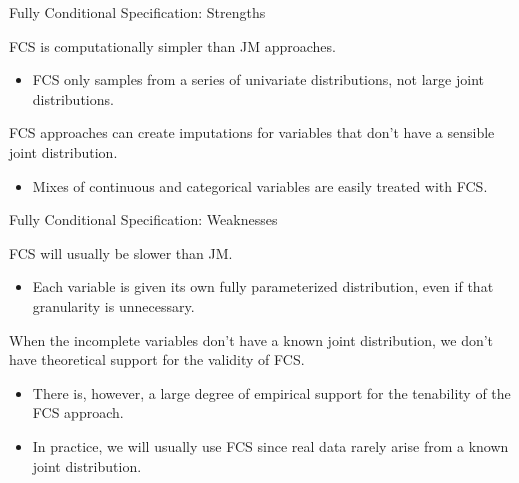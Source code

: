 \documentclass{beamer}\usepackage[]{graphicx}\usepackage[]{color}
\begin{document}

\begin{frame}{Fully Conditional Specification: Strengths}
  
  FCS is computationally simpler than JM approaches.
  \vc
  \begin{itemize}
  \item FCS only samples from a series of univariate distributions, not large 
    joint distributions.
  \end{itemize}
  \va 
  FCS approaches can create imputations for variables that don't have a sensible 
  joint distribution.
  \vc
  \begin{itemize}
  \item Mixes of continuous and categorical variables are easily treated with 
    FCS.
  \end{itemize}
  
\end{frame}


\begin{frame}{Fully Conditional Specification: Weaknesses}

  FCS will usually be slower than JM.
  \vc
  \begin{itemize}
  \item Each variable is given its own fully parameterized distribution, even if 
    that granularity is unnecessary.
  \end{itemize}
  \va
  When the incomplete variables don't have a known joint distribution, we don't 
  have theoretical support for the validity of FCS.
  \vc
  \begin{itemize}
  \item There is, however, a large degree of empirical support for the 
    tenability of the FCS approach.
  \item In practice, we will usually use FCS since real data rarely arise from a 
    known joint distribution.
  \end{itemize}
  
\end{frame}
  
\end{document}
